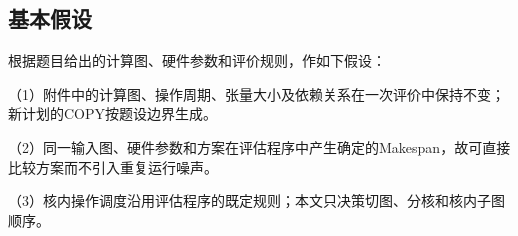 \subsection{基本假设}
根据题目给出的计算图、硬件参数和评价规则，作如下假设：

（1）附件中的计算图、操作周期、张量大小及依赖关系在一次评价中保持不变；新计划的COPY按题设边界生成。

（2）同一输入图、硬件参数和方案在评估程序中产生确定的Makespan，故可直接比较方案而不引入重复运行噪声。

（3）核内操作调度沿用评估程序的既定规则；本文只决策切图、分核和核内子图顺序。
